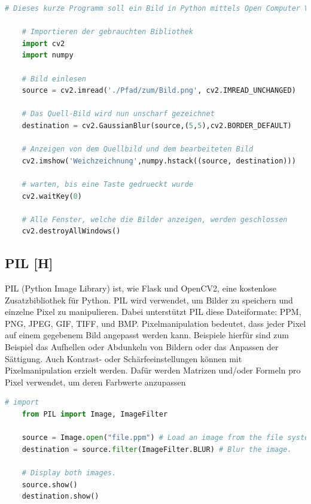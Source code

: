 \begin{lstlisting}[language=Python,caption=OpenCV Demo,label=lst:tech:gaussianBlur]
    # Dieses kurze Programm soll ein Bild in Python mittels Open Computer Vision weichzeichnen
    
    # Importieren der gebrauchten Bibliothek
    import cv2
    import numpy
    
    # Bild einlesen
    source = cv2.imread('./Pfad/zum/Bild.png', cv2.IMREAD_UNCHANGED)
    
    # Das Quell-Bild wird nun unscharf gezeichnet
    destination = cv2.GaussianBlur(source,(5,5),cv2.BORDER_DEFAULT)

    # Anzeigen von dem Quellbild und dem bearbeiteten Bild 
    cv2.imshow('Weichzeichnung',numpy.hstack((source, destination)))

    # warten, bis eine Taste gedrueckt wurde
    cv2.waitKey(0) 

    # Alle Fenster, welche die Bilder anzeigen, werden geschlossen
    cv2.destroyAllWindows() 
\end{lstlisting}


\subsection{PIL [H]}
PIL (Python Image Library) ist, wie Flask und OpenCV2, eine kostenlose Zusatzbibliothek für Python.
PIL wird verwendet, um Bilder zu speichern und einzelne Pixel zu manipulieren. Dabei unterstützt PIL diese
Dateiformate: PPM, PNG, JPEG, GIF, TIFF, und BMP. Pixelmanipulation bedeutet, dass jeder Pixel auf einem
gegebenem Bild angepasst werden kann. Beispiele hierfür sind zum Beispiel das Aufhellen oder Abdunkeln von
Bildern oder das Anpassen der Sättigung. Auch Kontrast- oder Schärfeeinstellungen können mit
Pixelmanipulation erzielt werden. Dafür werden Matrizen und/oder Formeln pro Pixel verwendet, um
deren Farbwerte anzupassen \cite{pil}
\\



\begin{lstlisting}[language=Python,caption=PIL Demo,label=lst:tech:PIL]
    # import
    from PIL import Image, ImageFilter  

    source = Image.open("file.ppm") # Load an image from the file system.
    destination = source.filter(ImageFilter.BLUR) # Blur the image.

    # Display both images.
    source.show() 
    destination.show()
\end{lstlisting}



